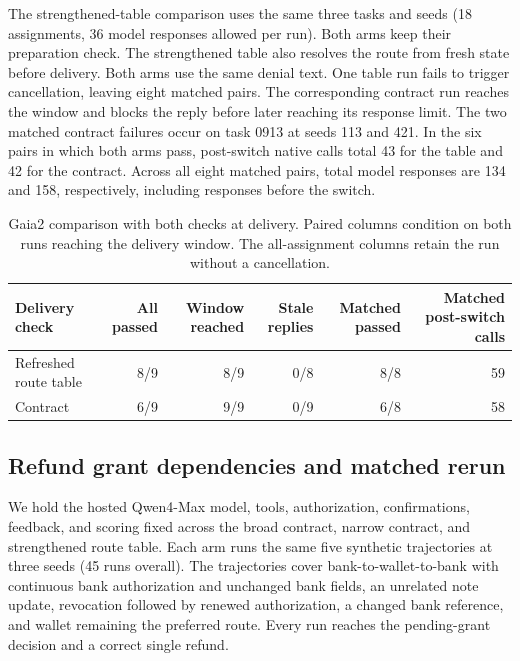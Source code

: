 The strengthened-table comparison uses the same three tasks and seeds (18 assignments, 36 model responses allowed per run). Both arms keep their preparation check. The strengthened table also resolves the route from fresh state before delivery. Both arms use the same denial text. One table run fails to trigger cancellation, leaving eight matched pairs. The corresponding contract run reaches the window and blocks the reply before later reaching its response limit. The two matched contract failures occur on task 0913 at seeds 113 and 421. In the six pairs in which both arms pass, post-switch native calls total 43 for the table and 42 for the contract. Across all eight matched pairs, total model responses are 134 and 158, respectively, including responses before the switch.

\begin{table}[t]
\centering
\small
\begin{tabular}{@{}lrrrrr@{}}
\toprule
Delivery check & All passed & Window reached & Stale replies & Matched passed & Matched post-switch calls\\
\midrule
Refreshed route table & 8/9 & 8/9 & 0/8 & 8/8 & 59\\
Contract & 6/9 & 9/9 & 0/9 & 6/8 & 58\\
\bottomrule
\end{tabular}
\caption{Gaia2 comparison with both checks at delivery. Paired columns condition on both runs reaching the delivery window. The all-assignment columns retain the run without a cancellation.}
\label{tab:gaia-refresh-details}
\end{table}



\subsection{Refund grant dependencies and matched rerun}
\label{sec:refund-binding-details}

We hold the hosted Qwen4-Max model, tools, authorization, confirmations, feedback, and scoring fixed across the broad contract, narrow contract, and strengthened route table. Each arm runs the same five synthetic trajectories at three seeds (45 runs overall). The trajectories cover bank-to-wallet-to-bank with continuous bank authorization and unchanged bank fields, an unrelated note update, revocation followed by renewed authorization, a changed bank reference, and wallet remaining the preferred route. Every run reaches the pending-grant decision and a correct single refund.

